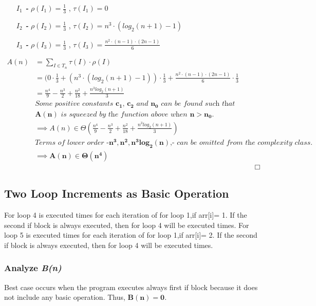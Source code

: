 \documentclass[10pt]{article}
\begin{document}
\begin{enumerate}[leftmargin=2.6cm]
    \item[\textit{\textbf{$I_{1}$ - }}] $\rho (\mathit{I_{1}}) = \frac{1}{3}$ ,  $\tau (\mathit{I_{1}})= 0$
    \item[\textit{\textbf{$I_{2}$ - }}] $\rho (\mathit{I_{2}}) = \frac{1}{3}$ ,  $\tau (\mathit{I_{2}}) = n^3 \cdot (log_2(n+1) - 1)$
    \item[\textit{\textbf{$I_{3}$ - }}] $\rho (\mathit{I_{3}}) = \frac{1}{3}$ ,  $\tau (\mathit{I_{3}}) = \frac{ n^2\cdot (n-1) \cdot (2n-1) } {6}$
\end{enumerate}
\begin{align*}
A(n) &= \displaystyle\sum _{I \in T_{n}} \tau (I) \cdot \rho (I) &&\\
 &= (0 \cdot \frac{1}{3} + (n^3 \cdot (log_2(n+1) - 1)) \cdot \frac{1}{3}+ \frac{ n^2\cdot (n-1) \cdot (2n-1) } {6} \cdot \frac {1}{3}&& \\
 &= \frac{n^4}{9} - \frac{n^3}{2} + \frac{n^2}{18} + \frac{n^3log_2(n+1)}{3}&& \\ 
 &\textit{Some positive constants $\mathbf{c_{1}}$, $\mathbf{c_{2}}$ and $\mathbf{n_{0}}$ can be found such that} && \\ 
 &\textit{$\mathbf{A(n)}$ is squeezed by the function above when $\mathbf{n > n_{0}}$.} && \\
 &\implies A(n) \in \Theta (\frac{n^4}{9} - \frac{n^3}{2} + \frac{n^2}{18} + \frac{n^3log_2(n+1)}{3}) && \\
 &\textit{Terms of lower order -$\mathbf{n^3, n^2, n^3log_2(n) \textbf{,}}$- can be omitted from the complexity class.} && \\
 &\implies \mathbf{A(n) \boldsymbol{\in} \Theta (n^4)} && \\
 & &&\Box
\end{align*}

\subsection{Two Loop Increments as Basic Operation}
For loop 4 is executed  times for each iteration of for loop 1,if arr[i]= 1. If the second if block is always executed, then for loop 4 will be executed  times.
For loop 5 is executed  times for each iteration of for loop 1,if arr[i]= 2. If the second if block is always executed, then for loop 4 will be executed  times.
\subsubsection{Analyze \textit{B(n)}}
Best case occurs when the program executes always first if block because it does not include any basic operation. Thus, $\mathbf{B(n) = 0}$.
\end{document}
